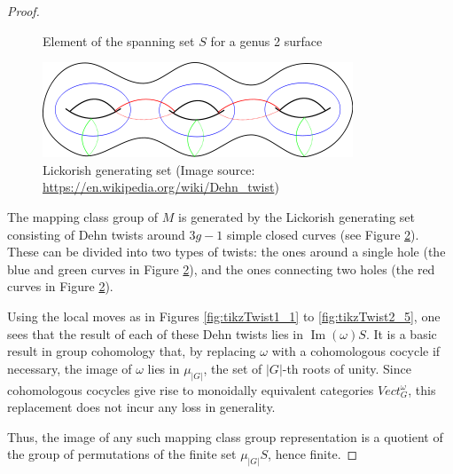 \documentclass{amsart}
\DeclareMathOperator{\Img}{Im}
\begin{document}
\begin{proof}
\begin{figure}
\caption{Element of the spanning set $S$ for a genus 2 surface}
\label{fig:span}
\end{figure}

\begin{figure}
 \includegraphics[width=.80\textwidth]{lickorish.png}
 \caption{Lickorish generating set (Image source: \url{https://en.wikipedia.org/wiki/Dehn_twist})}
\label{fig:lickorish}
\end{figure}


The mapping class group of $M$ is generated by the Lickorish generating set consisting of Dehn twists around $3g-1$ simple closed curves (see Figure \ref{fig:lickorish}).  These can be divided into two types of twists: the ones around a single hole (the blue and green curves in Figure \ref{fig:lickorish}), and the ones connecting two holes (the red curves in Figure \ref{fig:lickorish}).

 Using the local moves as in Figures \ref{fig:tikzTwist1_1} to \ref{fig:tikzTwist2_5}, one sees that the result of each of these Dehn twists lies in $\Img(\omega) S$.  It is a basic result in group cohomology that, by replacing $\omega$ with a cohomologous cocycle if necessary,  the image of $\omega$ lies in $\mu_{|G|}$, the set of $|G|$-th roots of unity.  Since cohomologous cocycles give rise to monoidally equivalent categories $Vect_G^\omega$, this replacement does not incur any loss in generality.

Thus, the image of any such mapping class group representation is a quotient of the group of permutations of the finite set $\mu_{|G|} S$, hence finite.
\end{proof}
\end{document}
